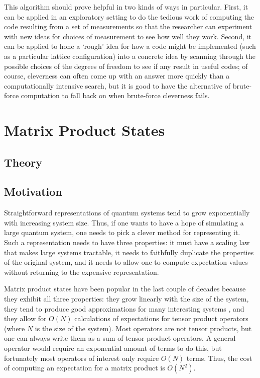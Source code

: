 \documentclass{amsbook}
\theoremstyle{plain}
\theoremstyle{definition}
\theoremstyle{remark}
\begin{document}
This algorithm should prove helpful in two kinds of ways in particular.  First, it can be applied in an exploratory setting to do the tedious work of computing the code resulting from a set of measurements so that the researcher can experiment with new ideas for choices of measurement to see how well they work.  Second, it can be applied to hone a `rough' idea for how a code might be implemented (such as a particular lattice configuration) into a concrete idea by scanning through the possible choices of the degrees of freedom to see if any result in useful codes; of course, cleverness can often come up with an answer more quickly than a computationally intensive search, but it is good to have the alternative of brute-force computation to fall back on when brute-force cleverness fails.
\part{Matrix Product States}
\chapter{Theory}
\chapter{Motivation}

Straightforward representations of quantum systems tend to grow exponentially with increasing system size.  Thus, if one wants to have a hope of simulating a large quantum system, one needs to pick a clever method for representing it.  Such a representation needs to have three properties:  it must have a scaling law that makes large systems tractable, it needs to faithfully duplicate the properties of the original system, and it needs to allow one to compute expectation values without returning to the expensive representation.

Matrix product states \cite{Rommer:1997gf} \cite{Perotti:2005bh} \cite{cond-mat/0404706} \cite{cond-mat/0505140} \cite{Schollwock:2005ul} have been popular in the last couple of decades because they exhibit all three properties:  they grow linearly with the size of the system, they tend to produce good approximations for many interesting systems \cite{cond-mat/0505140}, and they allow for $O(N)$ calculations of expectations for tensor product operators (where $N$ is the size of the system).  Most operators are not tensor products, but one can always write them as a sum of tensor product operators.  A general operator would require an exponential amount of terms to do this, but fortunately most operators of interest only require $O(N)$ terms.  Thus, the cost of computing an expectation for a matrix product is $O(N^2)$.
\end{document}
